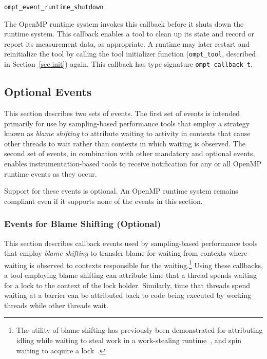 \documentclass{article}
\newcommand{\descheader}[1]{{\needspace{3\baselineskip}\vspace{1em}\noindent \fbox{#1}}}
\begin{document}
\descheader{Termination}

\begin{description}

\item \verb|ompt_event_runtime_shutdown|
 
The OpenMP runtime system invokes this callback before it shuts down the
 runtime system.  This callback enables a tool to clean up its
 state and record or report its measurement data, as appropriate. A runtime may later restart and reinitialize the tool by
calling the tool initializer
function (\verb|ompt_tool|, described in Section~\ref{sec:init}) again.
 This callback has type signature \verb|ompt_callback_t|. 


\end{description}

\subsection{Optional Events}
This section describes two sets of events. 
The first set of events is intended primarily for use by sampling-based performance tools that 
employ a strategy known as {\em blame shifting} to attribute waiting to activity in
 contexts that cause other threads to wait
rather than contexts in which waiting is observed.
The second set of events, in combination with other mandatory and optional events, 
enables instrumentation-based tools to receive notification for any or all OpenMP runtime events as they occur.
 
Support for these events is optional. An OpenMP runtime system remains compliant even if it supports none of the events in this section.


\subsubsection{Events for Blame Shifting (Optional)}
\label{sec:blame}
This section describes callback events used by sampling-based performance tools 
that employ {\em blame shifting} to transfer blame for waiting from contexts 
where waiting is observed to contexts responsible for the waiting.\footnote{The utility of blame shifting has previously been demonstrated for attributing 
idling while waiting to steal work 
in a work-stealing runtime~\cite{Tallent:PPoPP09}, and spin waiting to acquire a lock~\cite{Tallent:PPoPP10}.}
Using these callbacks, a tool employing blame shifting 
can attribute time that a thread spends waiting for a lock to the context of the lock holder.
Similarly, time that threads spend waiting at a barrier can be attributed back 
to code being executed by working threads while other threads wait.
\end{document}

